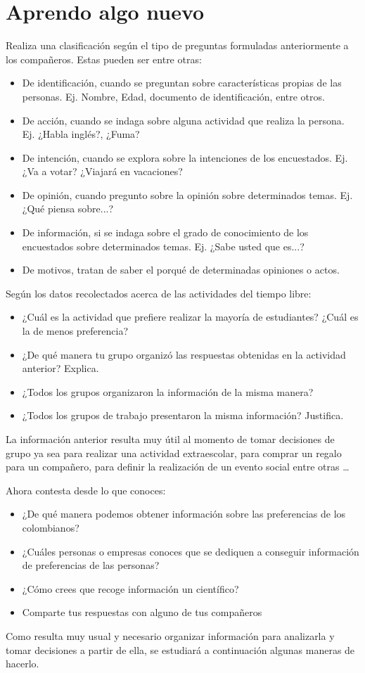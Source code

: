 \documentclass[10pt,twoside]{article}
\begin{document}
\section*{Aprendo algo nuevo}
Realiza una clasificación según el tipo de preguntas formuladas anteriormente a los compañeros. Estas pueden ser entre otras:
\begin{itemize}
 \item De identificación, cuando se preguntan sobre características propias de las personas. Ej. Nombre, Edad, documento de identificación, entre otros. 
 \item De acción, cuando se indaga sobre alguna actividad que realiza la persona. Ej. ¿Habla inglés?, ¿Fuma? 
 \item De intención, cuando se explora sobre la intenciones de los encuestados. Ej. ¿Va a votar? ¿Viajará en vacaciones? 
 \item De opinión, cuando pregunto sobre la opinión sobre
determinados temas. Ej. ¿Qué piensa sobre...?  
 \item De información, si se indaga sobre el grado de conocimiento de los encuestados sobre determinados temas. Ej. ¿Sabe usted que es...? 
 \item De motivos, tratan de saber el porqué de determinadas opiniones o actos.
\end{itemize}
Según los datos recolectados acerca de las actividades del tiempo libre:
\begin{itemize}
 \item ¿Cuál es la actividad que prefiere realizar la mayoría de estudiantes? ¿Cuál es la de menos preferencia? 
 \item ¿De qué manera tu grupo organizó las respuestas obtenidas en la actividad anterior? Explica. 
 \item ¿Todos los grupos organizaron la información de la
misma manera? 
 \item ¿Todos los grupos de trabajo presentaron la misma información? Justifica.
\end{itemize}
La información anterior resulta muy útil al momento de tomar decisiones de grupo ya sea para realizar una actividad extraescolar, para comprar un regalo para un compañero, para definir la realización de un evento social entre otras \ldots

Ahora contesta desde lo que conoces:
\begin{itemize}
 \item ¿De qué manera podemos obtener información sobre las preferencias de los
colombianos? 
 \item ¿Cuáles personas o empresas conoces que se dediquen a conseguir información de preferencias de las personas? 
 \item ¿Cómo crees que recoge información un científico?
 \item Comparte tus respuestas con alguno de tus compañeros
\end{itemize}
Como resulta muy usual y necesario organizar información para analizarla y tomar decisiones a partir de ella, se estudiará a continuación algunas maneras de hacerlo.
\end{document}
